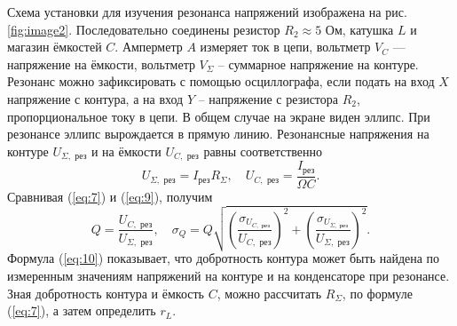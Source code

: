 \documentclass[a4paper,12pt]{article} %
\begin{document}
Схема установки для изучения резонанса напряжений изображена на рис. \ref{fig:image2}. Последовательно соединены резистор $ R_2 \approx 5 $ Ом, катушка $ L $ и магазин ёмкостей $ C $. Амперметр $ A $ измеряет ток в цепи, вольтметр $ V_C $ — напряжение на ёмкости, вольтметр $ V_{\Sigma} $ -- суммарное напряжение на контуре. Резонанс можно зафиксировать с помощью осциллографа, если подать на вход $ X $ напряжение с контура, а на вход $ Y $ -- напряжение с резистора $ R_2 $, пропорциональное току в цепи. В общем случае на экране виден эллипс. При резонансе эллипс вырождается в прямую линию.
Резонансные напряжения на контуре $ U_{\Sigma,\text{ рез}} $ и на ёмкости $ U_{C,\text{ рез}} $ равны соответственно
\begin{equation}\label{eq:9}
U_{\Sigma,\text{ рез}} = I_{\text{рез}}R_{\Sigma}, \quad U_{C,\text{ рез}} = \dfrac{I_{\text{рез}}}{\Omega C}.
\end{equation}
Сравнивая (\ref{eq:7}) и (\ref{eq:9}), получим
\begin{equation}\label{eq:10}
Q = \dfrac{U_{C,\text{ рез}}}{U_{\Sigma,\text{ рез}}}, \quad {\sigma _Q} = Q\sqrt {{{\left( {\frac{{{\sigma_{U_{C,\text{ рез}}}}}}{U_{C,\text{ рез}}}} \right)}^2} + {{\left( {\frac{{{\sigma_{U_{\Sigma,\text{ рез}}}}}}{U_{\Sigma,\text{ рез}}}} \right)}^2}} .
\end{equation}
Формула (\ref{eq:10}) показывает, что добротность контура может быть найдена по измеренным значениям напряжений на контуре и на конденсаторе при резонансе. Зная добротность контура и ёмкость $ C $, можно рассчитать $ R_{\Sigma} $, по формуле (\ref{eq:7}), а затем определить $ r_L $.
\end{document}
